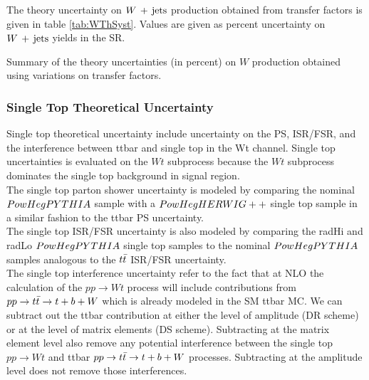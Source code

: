 \indent The theory uncertainty on $W\,+\,\mathrm{jets}$ production obtained from transfer factors is given in table \ref{tab:WThSyst}.  Values are given as percent uncertainty on $W\,+\,\mathrm{jets}$ yields in the SR.  \\

  \begin{table}[!h]
    \begin{center} \footnotesize
    
    \end{center}
    \caption{Summary of the theory uncertainties (in percent) on $W$ production obtained using variations on transfer factors. }
    \label{tab:WThSyst}
  \end{table}        

\subsubsection*{Single Top Theoretical Uncertainty}

\indent Single top theoretical uncertainty include uncertainty on the PS, ISR/FSR, and the interference between ttbar and single top in the Wt channel.  Single top uncertainties is evaluated on the $Wt$ subprocess because the $Wt$ subprocess dominates the single top background in signal region.  \\

\indent The single top parton shower uncertainty is modeled by comparing the nominal $PowHegPYTHIA$ sample with a $PowHegHERWIG++$ single top sample in a similar fashion to the ttbar PS uncertainty.  \\

\indent The single top ISR/FSR uncertainty is also modeled by comparing the radHi and radLo $PowHegPYTHIA$ single top samples to the nominal $PowHegPYTHIA$ samples analogous to the $t\bar{t}$ ISR/FSR uncertainty. \\

\indent The single top interference uncertainty refer to the fact that at NLO the calculation of the $pp \rightarrow Wt$ process will include contributions from $ pp \rightarrow t\bar{t} \rightarrow t + b + W$ which is already modeled in the SM ttbar MC.  We can subtract out the ttbar contribution at either the level of amplitude (DR scheme) or at the level of matrix elements (DS scheme).  Subtracting at the matrix element level also remove any potential interference between the single top $pp \rightarrow Wt$ and ttbar $ pp \rightarrow t\bar{t} \rightarrow t + b + W$ processes.  Subtracting at the amplitude level does not remove those interferences. \\

